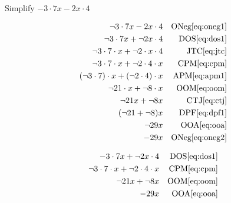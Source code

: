 \begin{example}[id:20141108-194431] \label{20141108-194431}  \hfill \\

Simplify $- 3\cdot 7x - 2x \cdot 4$

\soln

\solnsteps
\begin{align*}
\neg 3 \cdot 7x - 2x \cdot 4 && \text{ONeg} \eqref{eq:oneg1} \\
\neg 3 \cdot 7x +\neg 2x \cdot 4 && \text{DOS} \eqref{eq:dos1} \\
\neg 3 \cdot 7 \cdot x + \neg 2 \cdot x \cdot 4 && \text{JTC} \eqref{eq:jtc} \\
\neg 3 \cdot 7 \cdot x + \neg 2 \cdot 4 \cdot x && \text{CPM} \eqref{eq:cpm} \\
(\neg 3 \cdot 7) \cdot x + (\neg 2 \cdot 4) \cdot x && \text{APM} \eqref{eq:apm1} \\
\neg 21 \cdot x + \neg 8 \cdot x && \text{OOM} \eqref{eq:oom} \\
\neg 21 x + \neg 8 x && \text{CTJ} \eqref{eq:ctj} \\
(\neg 21 + \neg 8 )x && \text{DPF} \eqref{eq:dpf1} \\ 
\neg 29x && \text{OOA} \eqref{eq:ooa} \\
-29x && \text{ONeg} \eqref{eq:oneg2} 
\end{align*}

\soln

\lesssteps
\begin{align*}
-3 \cdot 7x + \neg 2x \cdot 4 && \text{DOS} \eqref{eq:dos1} \\
\neg 3 \cdot 7 \cdot x + \neg 2 \cdot 4 \cdot x && \text{CPM} \eqref{eq:cpm} \\
\neg 21x + \neg 8x && \text{OOM} \eqref{eq:oom} \\
-29x && \text{OOA} \eqref{eq:ooa} 
\end{align*}

\end{example}

